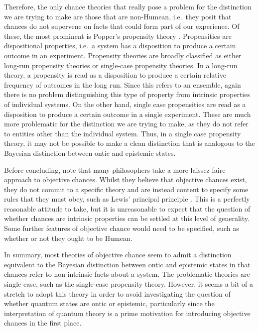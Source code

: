 \documentclass[DIV=calc,paper=a4,fontsize=11pt,twocolumn]{scrartcl} %
\theoremstyle{definition}
\theoremstyle{plain}
\begin{document}
Therefore, the only chance theories that really pose a problem for the
distinction we are trying to make are those that are non-Humean, i.e.\
they posit that chances do not supervene on facts that could form part
of our experience.  Of these, the most prominent is Popper's
propensity theory \cite{Popper2011}.  Propensities are dispositional
properties, i.e.\ a system has a disposition to produce a certain
outcome in an experiment.  Propensity theories are broadly classified
as either long-run propensity theories or single-case propensity
theories.  In a long-run theory, a propensity is read as a disposition
to produce a certain relative frequency of outcomes in the long run.
Since this refers to an ensemble, again there is no problem
distinguishing this type of property from intrinsic properties of
individual systems.  On the other hand, single case propensities are
read as a disposition to produce a certain outcome in a single
experiment.  These are much more problematic for the distinction we
are trying to make, as they do not refer to entities other than the
individual system.  Thus, in a single case propensity theory, it may
not be possible to make a clean distinction that is analogous to the
Bayesian distinction between ontic and epistemic states.

Before concluding, note that many philosophers take a more laissez
faire approach to objective chances.  Whilst they believe that
objective chances exist, they do not commit to a specific theory and
are instead content to specify some rules that they must obey, such as
Lewis' principal principle \cite{Lewis2011}.  This is a perfectly
reasonable attitude to take, but it is unreasonable to expect that the
question of whether chances are intrinsic properties can be settled at
this level of generality.  Some further features of objective chance
would need to be specified, such as whether or not they ought to be
Humean.

In summary, most theories of objective chance seem to admit a
distinction equivalent to the Bayesian distinction between ontic and
epistemic states in that chances refer to non intrinsic facts about a
system.  The problematic theories are single-case, such as the
single-case propensity theory.  However, it seems a bit of a stretch
to adopt this theory in order to avoid investigating the question of
whether quantum states are ontic or epistemic, particularly since the
interpretation of quantum theory is a prime motivation for introducing
objective chances in the first place.
\end{document}
